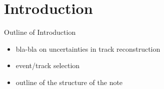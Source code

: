 \section{Introduction}
\FIXME Outline of Introduction
\begin{itemize}
\item bla-bla on uncertainties in track reconstruction
\item event/track selection
\item outline of the structure of the note
\end{itemize}

